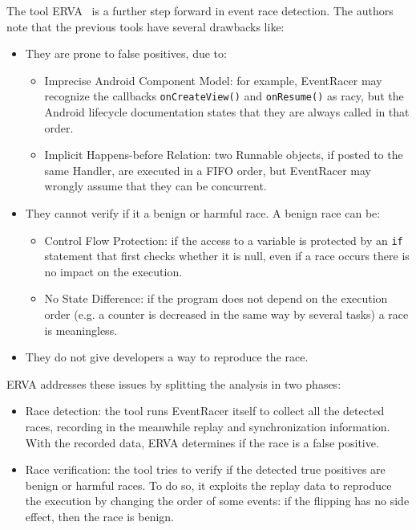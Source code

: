 \documentclass[11pt,a4paper,notitlepage]{article}
\begin{document}
The tool ERVA~\cite{Hu:2016:AVR:2931037.2931069} is a further step forward in event race detection. The authors note that the previous tools have several drawbacks like:
\begin{itemize}
	\item They are prone to false positives, due to:
	\begin{itemize}
		\item Imprecise Android Component Model: for example, EventRacer may recognize the callbacks \texttt{onCreateView()} and \texttt{onResume()} as racy, but the Android lifecycle documentation states that they are always called in that order.
		\item Implicit Happens-before Relation: two Runnable objects, if posted to the same Handler, are executed in a FIFO order, but EventRacer may wrongly assume that they can be concurrent.
	\end{itemize}
	\item They cannot verify if it a benign or harmful race. A benign race can be:
	\begin{itemize}
		\item Control Flow Protection: if the access to a variable is protected by an \texttt{if} statement that first checks whether it is null, even if a race occurs there is no impact on the execution.
		\item No State Difference: if the program does not depend on the execution order (e.g. a counter is decreased in the same way by several tasks) a race is meaningless.
	\end{itemize}
	\item They do not give developers a way to reproduce the race.
\end{itemize}
ERVA addresses these issues by splitting the analysis in two phases:
\begin{itemize}
	\item Race detection: the tool runs EventRacer itself to collect all the detected races, recording in the meanwhile replay and synchronization information. With the recorded data, ERVA determines if the race is a false positive.
	\item Race verification: the tool tries to verify if the detected true positives are benign or harmful races. To do so, it exploits the replay data to reproduce the execution by changing the order of some events: if the flipping has no side effect, then the race is benign.
\end{itemize}
\end{document}
